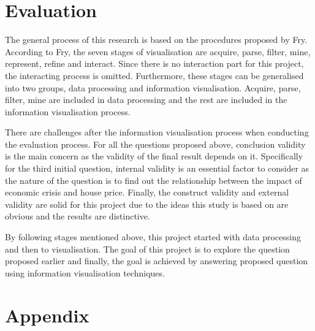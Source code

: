 \documentclass{article}
\begin{document}
\section{Evaluation}
The general process of this research is based on the procedures proposed by Fry\cite{Fry}. According to Fry\cite{Fry}, 
the seven stages of visualisation are acquire, parse, filter, mine, represent, refine and interact.
Since there is no interaction part for this project, the interacting process is omitted. Furthermore, 
these stages can be generalised into two groups, data processing and information visualisation. Acquire, parse, 
filter, mine are included in data processing and the rest are included in the information visualisation process. 

There are challenges after the information visualisation process when conducting the evaluation process.
For all the questions proposed above, conclusion validity is the main concern as the validity of the final result depends on it. Specifically for the third initial question, internal validity is an essential factor to consider as the nature of the question is to find out the relationship between the impact of economic crisis and house price. Finally, the construct validity and external validity are solid for this project due to 
the ideas this study is based on are obvious and the results are distinctive.

By following stages mentioned above, this project started with data processing and then to visualisation. The goal 
of this project is to explore the question proposed earlier and finally, the goal is achieved by answering proposed 
question using information visualisation techniques.







\vfill\pagebreak
\printbibliography

\vfill\pagebreak
\section*{Appendix}
\end{document}
